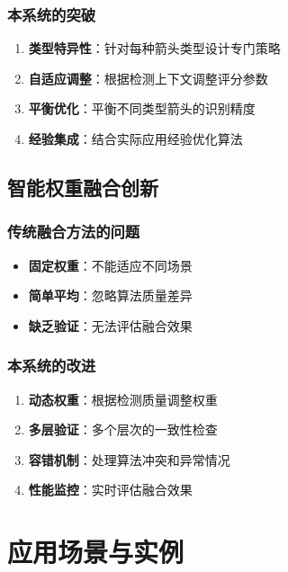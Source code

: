 \documentclass[12pt]{article}
\begin{document}
\subsubsection{本系统的突破}

\begin{enumerate}
    \item \textbf{类型特异性}：针对每种箭头类型设计专门策略
    \item \textbf{自适应调整}：根据检测上下文调整评分参数
    \item \textbf{平衡优化}：平衡不同类型箭头的识别精度
    \item \textbf{经验集成}：结合实际应用经验优化算法
\end{enumerate}

\subsection{智能权重融合创新}

\subsubsection{传统融合方法的问题}

\begin{itemize}
    \item \textbf{固定权重}：不能适应不同场景
    \item \textbf{简单平均}：忽略算法质量差异
    \item \textbf{缺乏验证}：无法评估融合效果
\end{itemize}

\subsubsection{本系统的改进}

\begin{enumerate}
    \item \textbf{动态权重}：根据检测质量调整权重
    \item \textbf{多层验证}：多个层次的一致性检查
    \item \textbf{容错机制}：处理算法冲突和异常情况
    \item \textbf{性能监控}：实时评估融合效果
\end{enumerate}

\section{应用场景与实例}
\end{document}

